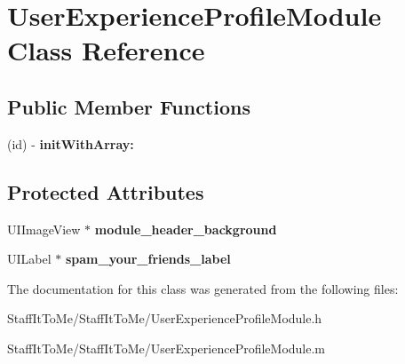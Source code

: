 \hypertarget{interface_user_experience_profile_module}{
\section{\-User\-Experience\-Profile\-Module \-Class \-Reference}
\label{interface_user_experience_profile_module}
}
\subsection*{\-Public \-Member \-Functions}
\begin{DoxyCompactItemize}
\item 
\hypertarget{interface_user_experience_profile_module_aca57eb81f0c6b8d9618c43181b153be1}{
(id) -\/ {\bfseries init\-With\-Array\-:}}
\label{interface_user_experience_profile_module_aca57eb81f0c6b8d9618c43181b153be1}

\end{DoxyCompactItemize}
\subsection*{\-Protected \-Attributes}
\begin{DoxyCompactItemize}
\item 
\hypertarget{interface_user_experience_profile_module_a24d7219a8f580535b4493f386b86b69a}{
\-U\-I\-Image\-View $\ast$ {\bfseries module\-\_\-header\-\_\-background}}
\label{interface_user_experience_profile_module_a24d7219a8f580535b4493f386b86b69a}

\item 
\hypertarget{interface_user_experience_profile_module_a26a7dfe6f3988e83f0c786f749079cf0}{
\-U\-I\-Label $\ast$ {\bfseries spam\-\_\-your\-\_\-friends\-\_\-label}}
\label{interface_user_experience_profile_module_a26a7dfe6f3988e83f0c786f749079cf0}

\end{DoxyCompactItemize}


\-The documentation for this class was generated from the following files\-:\begin{DoxyCompactItemize}
\item 
\-Staff\-It\-To\-Me/\-Staff\-It\-To\-Me/\-User\-Experience\-Profile\-Module.\-h\item 
\-Staff\-It\-To\-Me/\-Staff\-It\-To\-Me/\-User\-Experience\-Profile\-Module.\-m\end{DoxyCompactItemize}
